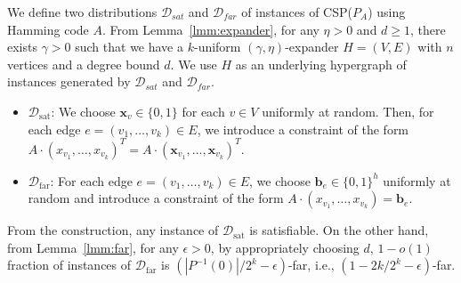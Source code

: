 \documentclass[letterpaper,11pt]{article}
\newcommand{\cald}{\mathcal{D}}
\newcommand{\caldsat}{\mathcal{D}_{\mathrm{sat}}}
\newcommand{\caldfar}{\mathcal{D}_{\mathrm{far}}}
\newcommand{\bfx}{\mathbf{x}}
\newcommand{\bfb}{\mathbf{b}}
\newcommand{\bit}{\{0,1\}}
\newcommand{\csp}[1]{\textsf{CSP}(#1)\xspace}
\begin{document}
We define two distributions $\cald_{sat}$ and $\cald_{far}$ of instances of \csp{$P_A$} using Hamming code $A$.
From Lemma~\ref{lmm:expander}, 
for any $\eta>0$ and $d\geq 1$,
there exists $\gamma>0$ such that we have a $k$-uniform $(\gamma,\eta)$-expander $H=(V,E)$ with $n$ vertices and a degree bound $d$.
We use $H$ as an underlying hypergraph of instances generated by $\cald_{sat}$ and $\cald_{far}$.
\begin{itemize}
  \item $\caldsat$: 
    We choose $\bfx_v \in \bit$ for each $v\in V$ uniformly at random. 
    Then, for each edge $e=(v_1,\ldots,v_k)\in E$, 
    we introduce a constraint of the form $A\cdot(x_{v_1},\ldots,x_{v_k})^T=A\cdot(\bfx_{v_1},\ldots,\bfx_{v_k})^T$.
  \item $\caldfar$:
    For each edge $e=(v_1,\ldots,v_k)\in E$,
    we choose $\bfb_e\in \bit^{h}$ uniformly at random and introduce a constraint of the form $A\cdot(x_{v_1},\ldots,x_{v_k})=\bfb_e$.
\end{itemize}
From the construction,
any instance of $\caldsat$ is satisfiable.
On the other hand, 
from Lemma~\ref{lmm:far}, 
for any $\epsilon>0$, by appropriately choosing $d$,
$1-o(1)$ fraction of instances of $\caldfar$ is $(|P^{-1}(0)|/2^k-\epsilon)$-far, i.e., $(1-2k/2^k-\epsilon)$-far.
\end{document}
